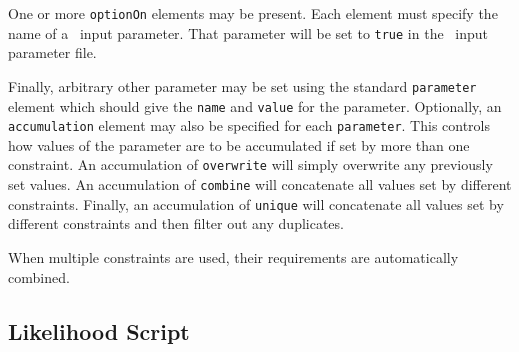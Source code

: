 One or more {\tt optionOn} elements may be present. Each element must specify the name of a \glc\ input parameter. That parameter will be set to {\tt true} in the \glc\ input parameter file.

Finally, arbitrary other parameter may be set using the standard {\tt parameter} element which should give the {\tt name} and {\tt value} for the parameter. Optionally, an {\tt accumulation} element may also be specified for each {\tt parameter}. This controls how values of the parameter are to be accumulated if set by more than one constraint. An accumulation of {\tt overwrite} will simply overwrite any previously set values. An accumulation of {\tt combine} will concatenate all values set by different constraints. Finally, an accumulation of {\tt unique} will concatenate all values set by different constraints and then filter out any duplicates.

When multiple constraints are used, their requirements are automatically combined.

\subsection{Likelihood Script}

